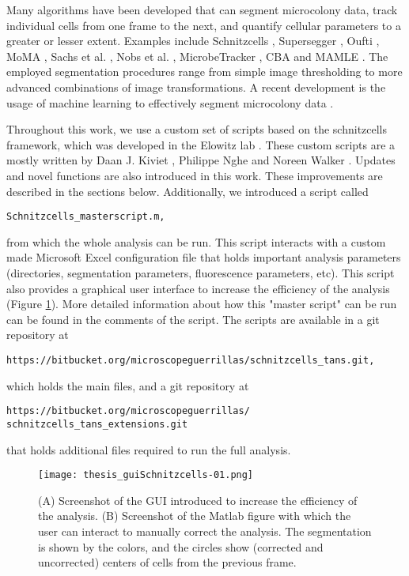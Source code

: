 Many algorithms have been developed that can segment microcolony data, track individual cells from one frame to the next, and quantify cellular parameters to a greater or lesser extent. Examples include Schnitzcells \cite{Young2012, Kiviet2014}, Supersegger \cite{Stylianidou2016}, Oufti \cite{Paintdakhi2016}, MoMA \cite{Kaiser2016}, Sachs et al. \cite{Sachs2016}, Nobs et al. \cite{Nobs2014}, MicrobeTracker \cite{Sliusarenko2011, Ullman2013}, CBA \cite{Sadanandan2016} and MAMLE \cite{Chowdhury2013}. 
The employed segmentation procedures range from simple image thresholding to more advanced combinations of image transformations. 
A recent development is the usage of machine learning to effectively segment microcolony data \cite{VanValen2016}.

Throughout this work, we use a custom set of scripts based on the schnitzcells framework, which was developed in the Elowitz lab \cite{Young2012}. 
These custom scripts are a mostly written by Daan J. Kiviet \cite{Kiviet2010}, Philippe Nghe and Noreen Walker \cite{Walker2016t}.
Updates and novel functions are also introduced in this work.
These improvements are described in the sections below.
Additionally, we introduced a script called
\begin{verbatim}
Schnitzcells_masterscript.m,
\end{verbatim}
from which the whole analysis can be run. 
This script interacts with a custom made Microsoft Excel configuration file that holds important analysis parameters (directories, segmentation parameters, fluorescence parameters, etc).
This script also provides a graphical user interface to increase the efficiency of the analysis (Figure \ref{fig:mm:GUI}).
More detailed information about how this "master script" can be run can be found in the comments of the script.
The scripts are available in a git repository at 
\begin{verbatim}
https://bitbucket.org/microscopeguerrillas/schnitzcells_tans.git,
\end{verbatim}
which holds the main files, 
and a git repository at
\begin{verbatim}
https://bitbucket.org/microscopeguerrillas/
schnitzcells_tans_extensions.git
\end{verbatim}
that holds additional files required to run the full analysis.


\begin{figure}
	\centering
	\texttt{[image: thesis\_guiSchnitzcells-01.png]}
	\caption{ 
		(A) Screenshot of the GUI introduced to increase the efficiency of the analysis.
		(B) Screenshot of the Matlab figure with which the user can interact to manually correct the analysis. The segmentation is shown by the colors, and the circles show (corrected and uncorrected) centers of cells from the previous frame.
	}
	\label{fig:mm:GUI}
\end{figure}

